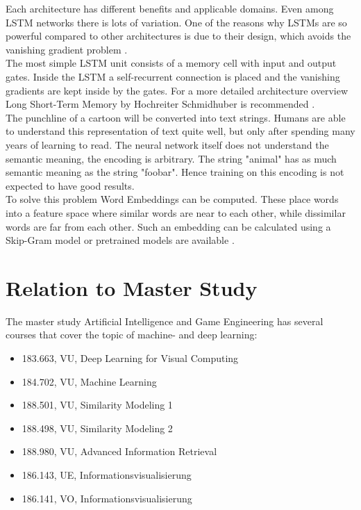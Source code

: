 \documentclass[draft,final,oneside]{vutinfth} %
\begin{document}
Each architecture has different benefits and applicable domains. Even among LSTM networks there is lots of variation. One of the reasons why LSTMs are so powerful compared to other architectures is due to their design, which avoids the vanishing gradient problem \cite {vanishinggradient}.\\

The most simple LSTM unit consists of a memory cell with input and output gates. Inside the LSTM a self-recurrent connection is placed and the vanishing gradients are kept inside by the gates. For a more detailed architecture overview Long Short-Term Memory by Hochreiter Schmidhuber is recommended \cite{hochreiter}. \\

The punchline of a cartoon will be converted into text strings. Humans are able to understand this representation of text quite well, but only after spending many years of learning to read. The neural network itself does not understand the semantic meaning, the encoding is arbitrary. The string "animal" has as much semantic meaning as the string "foobar". Hence training on this encoding is not expected to have good results. \\

To solve this problem Word Embeddings can be computed. These place words into a feature space where similar words are near to each other, while dissimilar words are far from each other. Such an embedding can be calculated using a Skip-Gram model \cite{wordembedding} or pretrained models are available \cite{pennington2014glove}.
\fi

\chapter{Relation to Master Study}
The master study Artificial Intelligence and Game Engineering has several courses that cover the topic of machine- and deep learning:

\begin{itemize}
\item 183.663, VU, Deep  Learning  for  Visual  Computing
\item 184.702, VU, Machine Learning
\item 188.501, VU, Similarity Modeling 1
\item 188.498, VU, Similarity Modeling 2
\item 188.980, VU, Advanced Information Retrieval
\item 186.143, UE, Informationsvisualisierung 
\item 186.141, VO, Informationsvisualisierung 
\end{itemize}
\end{document}
